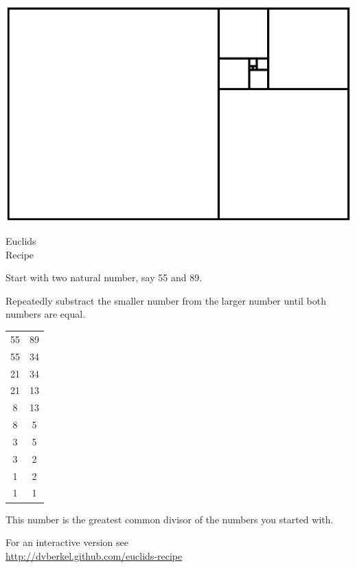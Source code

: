 \documentclass[a4paper]{article}
\begin{document}
\vspace*{\fill}

\includegraphics[width=\textwidth]{image/euclid.ps}

\begin{center}
  \Huge
  Euclids\\
  Recipe
\end{center}

Start with two natural number, say 55 and 89.

Repeatedly substract the smaller number from the larger number until
both numbers are equal.

\begin{center}
  \begin{tabular}{cc}
    55 & 89 \\
    55 & 34 \\
    21 & 34 \\
    21 & 13 \\
    8 & 13 \\
    8 &  5 \\
    3 &  5 \\
    3 &  2 \\
    1 &  2 \\
    1 &  1 \\
  \end{tabular}
\end{center}

This number is the greatest common divisor of the numbers you started with.

For an interactive version see\\
{\scriptsize\url{http://dvberkel.github.com/euclids-recipe}}

\vspace{\fill}
\end{document}
